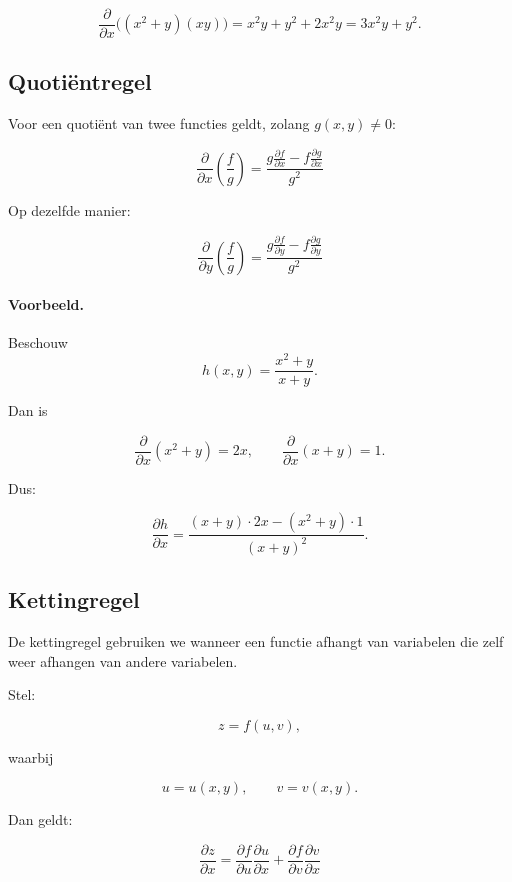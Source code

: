 \documentclass[11pt,a4paper]{article}
\begin{document}
    \[
        \frac{\partial}{\partial x}\bigl((x^2+y)(xy)\bigr)
        =
        x^2y + y^2 + 2x^2y
        =
        3x^2y + y^2.
    \]

    \subsection{Quoti\"entregel}

    Voor een quoti\"ent van twee functies geldt, zolang $g(x,y)\neq 0$:

    \[
        \frac{\partial}{\partial x}\left(\frac{f}{g}\right)
        =
        \frac{
            g\frac{\partial f}{\partial x}
            -
            f\frac{\partial g}{\partial x}
        }{g^2}
    \]

    Op dezelfde manier:

    \[
        \frac{\partial}{\partial y}\left(\frac{f}{g}\right)
        =
        \frac{
            g\frac{\partial f}{\partial y}
            -
            f\frac{\partial g}{\partial y}
        }{g^2}
    \]

    \paragraph{Voorbeeld.}
    Beschouw
    \[
        h(x,y)=\frac{x^2+y}{x+y}.
    \]

    Dan is

    \[
        \frac{\partial}{\partial x}(x^2+y)=2x,
        \qquad
        \frac{\partial}{\partial x}(x+y)=1.
    \]

    Dus:

    \[
        \frac{\partial h}{\partial x}
        =
        \frac{(x+y)\cdot 2x - (x^2+y)\cdot 1}{(x+y)^2}.
    \]

    \subsection{Kettingregel}

    De kettingregel gebruiken we wanneer een functie afhangt van variabelen die zelf
    weer afhangen van andere variabelen.

    Stel:

    \[
        z=f(u,v),
    \]

    waarbij

    \[
        u=u(x,y),
        \qquad
        v=v(x,y).
    \]

    Dan geldt:

    \[
        \frac{\partial z}{\partial x}
        =
        \frac{\partial f}{\partial u}\frac{\partial u}{\partial x}
        +
        \frac{\partial f}{\partial v}\frac{\partial v}{\partial x}
    \]
\end{document}
